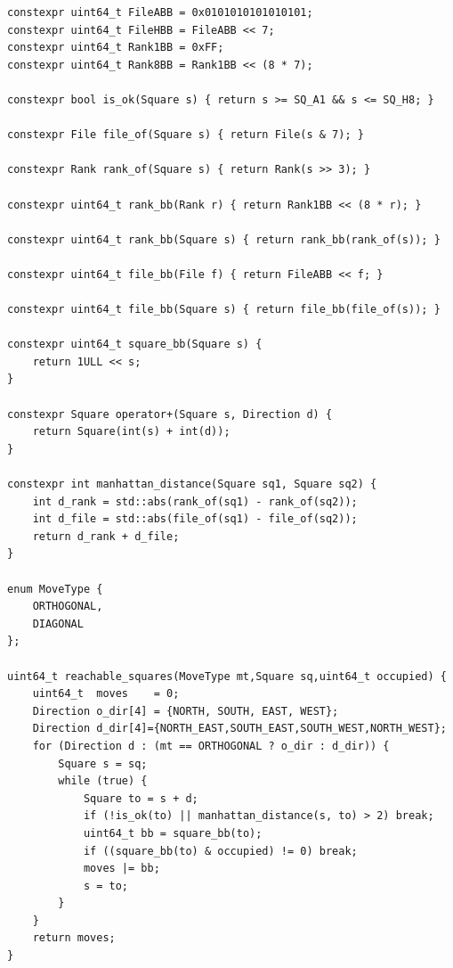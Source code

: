 \documentclass[12pt,a4paper,twoside,openright]{book}
\begin{document}
\begin{mdframed}[skipabove=\baselineskip,hidealllines=true]
\begin{verbatim}
constexpr uint64_t FileABB = 0x0101010101010101;
constexpr uint64_t FileHBB = FileABB << 7;
constexpr uint64_t Rank1BB = 0xFF;
constexpr uint64_t Rank8BB = Rank1BB << (8 * 7);

constexpr bool is_ok(Square s) { return s >= SQ_A1 && s <= SQ_H8; }

constexpr File file_of(Square s) { return File(s & 7); }

constexpr Rank rank_of(Square s) { return Rank(s >> 3); }

constexpr uint64_t rank_bb(Rank r) { return Rank1BB << (8 * r); }

constexpr uint64_t rank_bb(Square s) { return rank_bb(rank_of(s)); }

constexpr uint64_t file_bb(File f) { return FileABB << f; }

constexpr uint64_t file_bb(Square s) { return file_bb(file_of(s)); }

constexpr uint64_t square_bb(Square s) {
    return 1ULL << s;
}

constexpr Square operator+(Square s, Direction d) { 
    return Square(int(s) + int(d)); 
}

constexpr int manhattan_distance(Square sq1, Square sq2) {
    int d_rank = std::abs(rank_of(sq1) - rank_of(sq2));
    int d_file = std::abs(file_of(sq1) - file_of(sq2));
    return d_rank + d_file;
}

enum MoveType {
    ORTHOGONAL,
    DIAGONAL
};

uint64_t reachable_squares(MoveType mt,Square sq,uint64_t occupied) {
    uint64_t  moves    = 0;
    Direction o_dir[4] = {NORTH, SOUTH, EAST, WEST};
    Direction d_dir[4]={NORTH_EAST,SOUTH_EAST,SOUTH_WEST,NORTH_WEST};
    for (Direction d : (mt == ORTHOGONAL ? o_dir : d_dir)) {
        Square s = sq;
        while (true) {            
            Square to = s + d;
            if (!is_ok(to) || manhattan_distance(s, to) > 2) break;
            uint64_t bb = square_bb(to);            
            if ((square_bb(to) & occupied) != 0) break;
            moves |= bb;
            s = to;
        } 
    }
    return moves;
}


\end{verbatim}
\end{mdframed}
\end{document}
